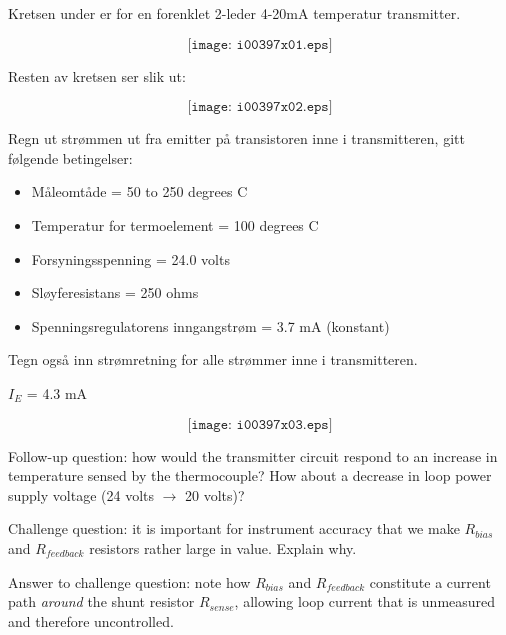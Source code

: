 

Kretsen under er for en forenklet 2-leder 4-20mA temperatur transmitter. 

$$\texttt{[image: i00397x01.eps]}$$

\vskip 10pt

Resten av kretsen ser slik ut:

$$\texttt{[image: i00397x02.eps]}$$

Regn ut strømmen ut fra emitter på transistoren inne i transmitteren, gitt følgende betingelser:

\begin{itemize}
\item{} Måleomtåde = 50 to 250 degrees C
\item{} Temperatur for termoelement = 100 degrees C
\item{} Forsyningsspenning = 24.0 volts
\item{} Sløyferesistans = 250 ohms
\item{} Spenningsregulatorens inngangstrøm = 3.7 mA (konstant)
\end{itemize}

Tegn også inn strømretning for alle strømmer inne i transmitteren. 







$I_E$ = 4.3 mA

$$\texttt{[image: i00397x03.eps]}$$

\vskip 10pt

Follow-up question: how would the transmitter circuit respond to an increase in temperature sensed by the thermocouple?  How about a decrease in loop power supply voltage (24 volts $\to$ 20 volts)?

\vskip 10pt

Challenge question: it is important for instrument accuracy that we make $R_{bias}$ and $R_{feedback}$ resistors rather large in value.  Explain why.







Answer to challenge question: note how $R_{bias}$ and $R_{feedback}$ constitute a current path {\it around} the shunt resistor $R_{sense}$, allowing loop current that is unmeasured and therefore uncontrolled.




